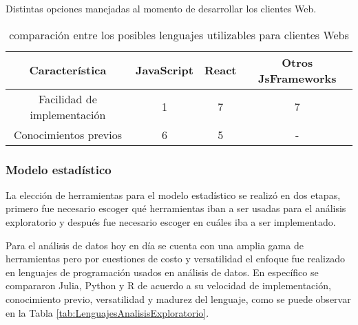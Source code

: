     \begin{table}[ht]
        \caption[Comparativa de posibles lenguajes nivel cliente Web]{comparación entre
        los posibles lenguajes utilizables para clientes Webs}
        \label{tab:LenguajesCliente}
        \begin{center}
            Distintas opciones manejadas al momento de desarrollar los clientes Web.\\

            \vspace{0.3cm}
            \begin{tabular}{|c|c|c|c|}
                \hline
                Característica              & JavaScript & React & Otros JsFrameworks\\\hline
                \hline
                Facilidad de implementación & 1         & 7     &  7\\\hline
                Conocimientos previos       & 6         & 5     &  - \\\hline
            \end{tabular}
        \end{center}
    \end{table}



    \subsubsection{Modelo estadístico}
    La elección de herramientas para el modelo estadístico se realizó en dos
    etapas, primero fue necesario escoger qué herramientas iban a ser usadas
    para el análisis exploratorio y después fue necesario escoger en cuáles iba
    a ser implementado.

    Para el análisis de datos hoy en día se cuenta con una amplia gama de
    herramientas pero por cuestiones de costo y versatilidad el enfoque fue
    realizado en lenguajes de programación usados en análisis de datos. En
    específico se compararon Julia, Python y R de acuerdo a su velocidad de
    implementación, conocimiento previo, versatilidad y madurez del lenguaje, como
    se puede observar en la Tabla \ref{tab:LenguajesAnalisisExploratorio}.

